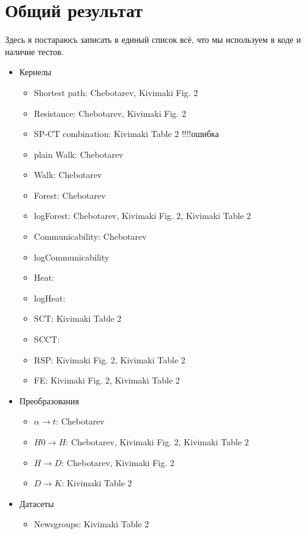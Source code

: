 \documentclass{article}
\begin{document}
\section{Общий результат}
Здесь я постараюсь записать в единый список всё, что мы используем в коде и наличие тестов.
\begin{itemize}
  \item Кернелы
  \begin{itemize}
    \item Shortest path: Chebotarev, Kivimaki Fig. 2
    \item Resistance: Chebotarev, Kivimaki Fig. 2
    \item SP-CT combination: Kivimaki Table 2 !!!!ошибка
    \item plain Walk: Chebotarev
    \item Walk: Chebotarev
    \item Forest: Chebotarev
    \item logForest: Chebotarev, Kivimaki Fig. 2, Kivimaki Table 2
    \item Communicability: Chebotarev
    \item logCommunicability
    \item Heat:
    \item logHeat:
    \item SCT: Kivimaki Table 2
    \item SCCT:
    \item RSP: Kivimaki Fig. 2, Kivimaki Table 2
    \item FE: Kivimaki Fig. 2, Kivimaki Table 2
  \end{itemize}
  \item Преобразования
  \begin{itemize}
    \item $\alpha \rightarrow t$: Chebotarev
    \item $H0 \rightarrow H$: Chebotarev, Kivimaki Fig. 2, Kivimaki Table 2 
    \item $H \rightarrow D$: Chebotarev, Kivimaki Fig. 2
    \item $D \rightarrow K$: Kivimaki Table 2
   \end{itemize}
   \item Датасеты
   \begin{itemize}
     \item Newsgroups: Kivimaki Table 2
   \end{itemize}
\end{itemize}
\end{document}
